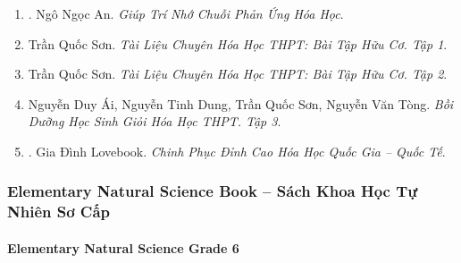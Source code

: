 \documentclass{article}
\begin{document}
\begin{enumerate}
	\item \cite{An_chuoi_PUHH}. Ngô Ngọc An. {\it Giúp Trí Nhớ Chuỗi Phản Ứng Hóa Học}.\hfill{\sf[reading]}

	\item Trần Quốc Sơn. {\it Tài Liệu Chuyên Hóa Học THPT: Bài Tập Hữu Cơ. Tập 1}.

	\item Trần Quốc Sơn. {\it Tài Liệu Chuyên Hóa Học THPT: Bài Tập Hữu Cơ. Tập 2}.

	\item Nguyễn Duy Ái, Nguyễn Tinh Dung, Trần Quốc Sơn, Nguyễn Văn Tòng. {\it Bồi Dưỡng Học Sinh Giỏi Hóa Học THPT. Tập 3}.

	\item \cite{Lovebook2022}. Gia Đình Lovebook. {\it Chinh Phục Đỉnh Cao Hóa Học Quốc Gia -- Quốc Tế}.\hfill{\sf[reading]}
\end{enumerate}

\subsubsection{Elementary Natural Science Book -- Sách Khoa Học Tự Nhiên Sơ Cấp}

\paragraph{Elementary Natural Science Grade 6}
\end{document}
